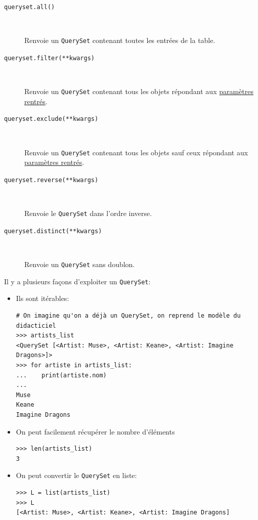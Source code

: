 \documentclass[a4paper, 10pt]{article}
\begin{document}
\begin{description}
    \item[\texttt{queryset.all()}]~

          Renvoie un \texttt{QuerySet} contenant toutes les entrées de la table.

    \item[\texttt{queryset.filter(**kwargs)}]~

          Renvoie un \texttt{QuerySet} contenant tous les objets répondant aux \href{https://docs.djangoproject.com/fr/2.2/ref/models/querysets/#field-lookups}{paramètres rentrés}.

    \item[\texttt{queryset.exclude(**kwargs)}]~

          Renvoie un \texttt{QuerySet} contenant tous les objets sauf ceux répondant aux \href{https://docs.djangoproject.com/fr/2.2/ref/models/querysets/#field-lookups}{paramètres rentrés}.

    \item[\texttt{queryset.reverse(**kwargs)}]~

          Renvoie le \texttt{QuerySet} dans l'ordre inverse.

    \item[\texttt{queryset.distinct(**kwargs)}]~

          Renvoie un \texttt{QuerySet} sans doublon.
\end{description}

Il y a plusieurs façons d'exploiter un \texttt{QuerySet}:
\begin{itemize}
    \item Ils sont itérables:
          \begin{verbatim}
# On imagine qu'on a déjà un QuerySet, on reprend le modèle du didacticiel
>>> artists_list
<QuerySet [<Artist: Muse>, <Artist: Keane>, <Artist: Imagine Dragons>]>
>>> for artiste in artists_list:
...    print(artiste.nom)
...
Muse
Keane
Imagine Dragons
    \end{verbatim}

    \item On peut facilement récupérer le nombre d'éléments
          \begin{verbatim}
>>> len(artists_list)
3
    \end{verbatim}

    \item On peut convertir le \texttt{QuerySet} en liste:
          \begin{verbatim}
>>> L = list(artists_list)
>>> L
[<Artist: Muse>, <Artist: Keane>, <Artist: Imagine Dragons]
    \end{verbatim}

\end{itemize}
\end{document}
